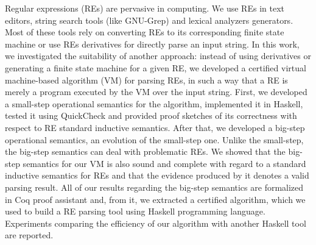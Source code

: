 \documentclass[oneside,12pt]{scrbook}
\theoremstyle{definition}
\theoremstyle{plain}
\theoremstyle{definition}
\begin{document}
Regular expressions (REs) are pervasive in computing. We use REs in text editors, string search tools (like GNU-Grep) and lexical analyzers generators. Most of these tools rely on converting REs to its corresponding finite state machine or use REs derivatives for directly parse an input string. In this work, we investigated the suitability of another approach: instead of using derivatives or generating a finite state machine for a given RE, we developed a certified virtual machine-based algorithm (VM) for parsing REs, in such a way that a RE is merely a program executed by the VM over the input string. First, we developed a small-step operational semantics for the algorithm, implemented it in Haskell, tested it using QuickCheck and provided proof sketches of its correctness with respect to RE standard inductive semantics. After that, we developed a big-step operational semantics, an evolution of the small-step one. Unlike the small-step, the big-step semantics can deal with problematic REs. We showed that the big-step semantics for our VM is also sound and complete with regard to a standard inductive semantics for REs and that the evidence produced by it denotes a valid parsing result. All of our results regarding the big-step semantics are formalized in Coq proof assistant and, from it, we extracted a certified algorithm, which we used to build a RE parsing tool using Haskell programming language. Experiments comparing the efficiency of our algorithm with another Haskell tool are reported.


\end{document}
